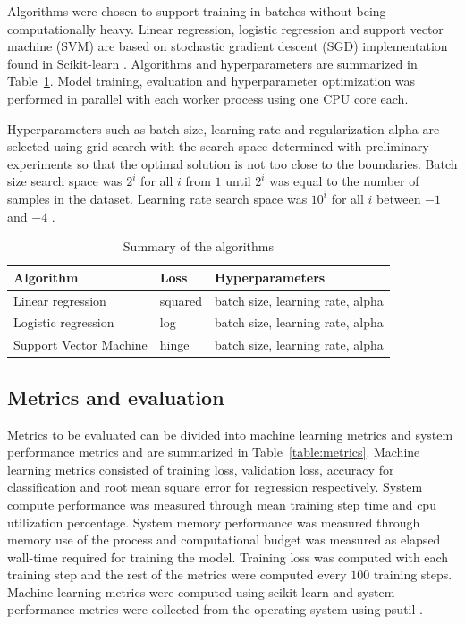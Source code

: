 Algorithms were chosen to support training in batches without being computationally heavy. Linear regression, logistic regression and support vector machine (SVM) are based on stochastic gradient descent (SGD) implementation found in Scikit-learn \parencite{pedregosaScikitlearnMachineLearning2011}. Algorithms and hyperparameters are summarized in Table~\ref{table:algorithms}. Model training, evaluation and hyperparameter optimization was performed in parallel with each worker process using one CPU core each.

Hyperparameters such as batch size, learning rate and regularization alpha are selected using grid search with the search space determined with preliminary experiments so that the optimal solution is not too close to the boundaries. Batch size search space was $2^i$ for all $i$ from $1$ until $2^i$ was equal to the number of samples in the dataset. Learning rate search space was $10^i$ for all $i$ between $-1$ and $-4$ .



\begin{table}[h]
    \centering
    \begin{tabular}{lll}
        \toprule
        Algorithm              & Loss    & Hyperparameters                  \\
        \midrule
        Linear regression      & squared & batch size, learning rate, alpha \\
        Logistic regression    & log     & batch size, learning rate, alpha \\
        Support Vector Machine & hinge   & batch size, learning rate, alpha \\
        \bottomrule
    \end{tabular}
    \caption{Summary of the algorithms}
    \label{table:algorithms}
\end{table}

\subsection{Metrics and evaluation}
Metrics to be evaluated can be divided into machine learning metrics and system performance metrics and are summarized in Table~\ref{table:metrics}. Machine learning metrics consisted of training loss, validation loss, accuracy for classification and root mean square error for regression respectively. System compute performance was measured through mean training step time and cpu utilization percentage. System memory performance was measured through memory use of the process and computational budget was measured as elapsed wall-time required for training the model. Training loss was computed with each training step and the rest of the metrics were computed every $100$ training steps. Machine learning metrics were computed using scikit-learn \parencite{pedregosaScikitlearnMachineLearning2011} and system performance metrics were collected from the operating system using psutil \parencite{rodolaGiampaoloPsutil2023}.

